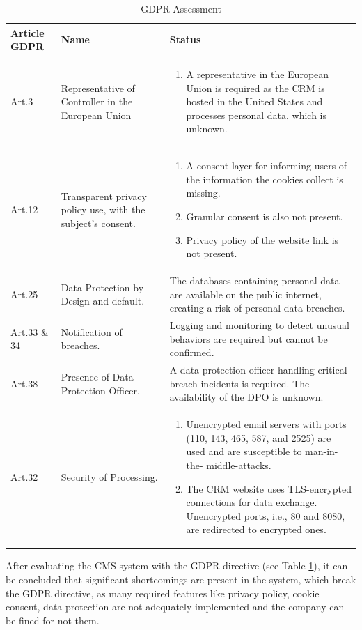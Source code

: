 \begingroup
\centering
\setlength{\tabcolsep}{6.5pt} %
\renewcommand{\arraystretch}{1.8} %
\begin{longtable}{ |p{3cm}|p{5cm}| p{7cm} |}
\caption{GDPR Assessment}
    \label{table:gdpr}
\hline
\rowcolor{grey!15}
\textbf{Article GDPR} & \textbf{Name}  & \textbf{Status}\\
\hline
Art.3 & Representative of Controller in the European Union  &
\vspace{-\baselineskip}
\begin{enumerate}
    \item A representative in the European Union is required as the CRM is hosted in the United States and processes personal data, which is unknown.
\end{enumerate}\\
\hline
Art.12 & Transparent privacy policy use, with the subject's consent.  &  
\vspace{-\baselineskip}
\begin{enumerate}
    \item A consent layer for informing users of the information the cookies collect is missing.
    \item Granular consent is also not present.
    \item Privacy policy of the website link is not present.
\end{enumerate}\\
\hline
Art.25 & Data Protection by Design and default.  &  
The databases containing personal data are available on the public internet, creating a risk of personal data breaches.\\
\hline
Art.33 \& 34 & Notification of breaches.  &  
 Logging and monitoring to detect unusual behaviors are required but cannot be confirmed.
\\
\hline
Art.38 & Presence of Data Protection Officer.  &  
 A data protection officer handling critical breach incidents is required. The availability of the DPO is unknown.
\\
\hline
Art.32 & Security of Processing.  &  
\vspace{-\baselineskip}
\begin{enumerate}
    \item Unencrypted email servers with ports (110, 143, 465, 587, and 2525) are used and are susceptible to man-in-the- middle-attacks.
    \item The CRM website uses TLS-encrypted connections for data exchange. Unencrypted ports, i.e., 80 and 8080, are redirected to encrypted ones.  
\end{enumerate}\\
\hline
\end{longtable}
\endgroup
After evaluating the CMS system with the GDPR directive (see Table \ref{table:gdpr}), it can be concluded that significant shortcomings are present in the system, which break the GDPR directive, as many required features like privacy policy, cookie consent, data protection are not adequately implemented and the company can be fined for not them.

